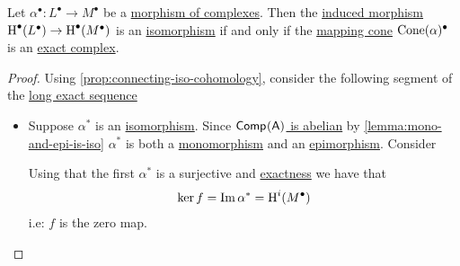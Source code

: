 \documentclass[../../../main]{subfiles}
\begin{document}
\begin{corollary} \label{cor:exactness-mapping-cone}
  Let \(\alpha^{\bullet}: L^{\bullet} \to M^{\bullet}\) be a \hyperref[def:complex-morphism]{morphism of complexes}.
  Then the \hyperref[thm:LES-in-cohomology]{induced morphism} \(\operatorname{H}^{\bullet}(L^{\bullet}) \to \operatorname{H}^{\bullet}(M^{\bullet})\) is an \hyperref[def:categorical-isomorphism]{isomorphism} if and only if the \hyperref[def:mapping-cone]{mapping cone} \(\operatorname{Cone}(\alpha)^{\bullet}\) is an \hyperref[def:exact-complex]{exact complex}.
\end{corollary}
\begin{proof}
  Using \autoref{prop:connecting-iso-cohomology}, consider the following segment of the \hyperref[def:exact-complex]{long exact sequence}
  \begin{center}
  \end{center}
  \begin{itemize}
    \item[\(\implies\)] Suppose \(\alpha^{\ast}\) is an \hyperref[def:categorical-isomorphism]{isomorphism}.
          Since \hyperref[thm:complex-category-is-abelian]{\(\mathsf{Comp}^{}(\mathsf{A})\) is abelian} by \autoref{lemma:mono-and-epi-is-iso} \(\alpha^{\ast}\) is both a \hyperref[def:mono-epi-morphism]{monomorphism} and an \hyperref[def:mono-epi-morphism]{epimorphism}. Consider
          \begin{center}
          \end{center}
          Using that the first \(\alpha^{\ast}\) is a surjective and \hyperref[def:exact-complex-sequence]{exactness} we have that
          \begin{align*}
            \ker f = \operatorname*{Im} \alpha^{\ast} = \operatorname{H}^{i}(M^{\bullet})
          \end{align*}
          i.e: \(f\) is the zero map.


\end{itemize}
\end{proof}
\end{document}
